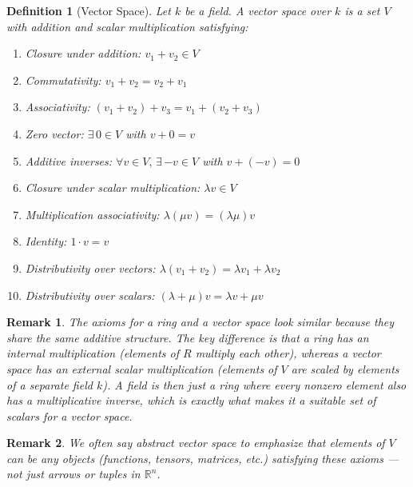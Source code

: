 \documentclass{article}
\newtheorem{definition}{Definition}
\newtheorem{remark}{Remark}
\begin{document}
\begin{definition}[Vector Space]
    Let $k$ be a field. A vector space over $k$ is a set $V$ with addition and scalar multiplication satisfying:
    \begin{enumerate}
        \item Closure under addition: $v_1+v_2\in V$
        \item Commutativity: $v_1 + v_2 = v_2 + v_1$
        \item Associativity: $(v_1 + v_2) + v_3 = v_1 + (v_2 + v_3)$
        \item Zero vector: $\exists\, 0 \in V$ with $v+0=v$
        \item Additive inverses: $\forall v \in V,\, \exists\, {-v} \in V$ with $v+(-v)=0$
        \item Closure under scalar multiplication: $\lambda v\in V$
        \item Multiplication associativity: $\lambda(\mu v) = (\lambda\mu)v$
        \item Identity: $1\cdot v = v$
        \item Distributivity over vectors: $\lambda(v_1 + v_2) = \lambda v_1 + \lambda v_2$
        \item Distributivity over scalars: $(\lambda + \mu)v = \lambda v + \mu v$
    \end{enumerate}
\end{definition}
\begin{remark}
    The axioms for a ring and a vector space look similar because they share the same additive structure. The key difference is that a ring has an internal multiplication (elements of $R$ multiply each other), whereas a vector space has an external scalar multiplication (elements of $V$ are scaled by elements of a separate field $k$). A field is then just a ring where every nonzero element also has a multiplicative inverse, which is exactly what makes it a suitable set of scalars for a vector space.
\end{remark}
\begin{remark}
    We often say \emph{abstract} vector space to emphasize that elements of $V$ can be any objects (functions, tensors, matrices, etc.) satisfying these axioms --- not just arrows or tuples in $\mathbb{R}^n$.
\end{remark}
\end{document}
